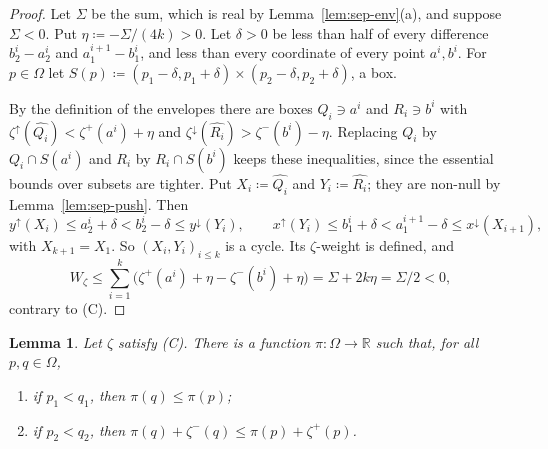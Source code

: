 \documentclass[11pt]{article}
\newtheorem{lemma}[theorem]{Lemma}
\theoremstyle{definition}\newtheorem{definition}[theorem]{Definition}
\theoremstyle{remark}\newtheorem{remark}[theorem]{Remark}
\begin{document}
\begin{proof}
Let $\Sigma$ be the sum, which is real by Lemma~\ref{lem:sep-env}(a), and
suppose $\Sigma<0$. Put $\eta\coloneqq-\Sigma/(4k)>0$. Let $\delta>0$ be less
than half of every difference $b^i_2-a^i_2$ and $a^{i+1}_1-b^i_1$, and less
than every coordinate of every point $a^i,b^i$. For $p\in\Omega$ let
$S(p)\coloneqq(p_1-\delta,p_1+\delta)\times(p_2-\delta,p_2+\delta)$, a box.

By the definition of the envelopes there are boxes $Q_i\ni a^i$ and
$R_i\ni b^i$ with $\zeta^{\uparrow}(\widehat{Q_i})<\zeta^+(a^i)+\eta$ and
$\zeta^{\downarrow}(\widehat{R_i})>\zeta^-(b^i)-\eta$. Replacing $Q_i$ by
$Q_i\cap S(a^i)$ and $R_i$ by $R_i\cap S(b^i)$ keeps these inequalities,
since the essential bounds over subsets are tighter. Put
$X_i\coloneqq\widehat{Q_i}$ and $Y_i\coloneqq\widehat{R_i}$; they are
non-null by Lemma~\ref{lem:sep-push}. Then
\[
 y^{\uparrow}(X_i)\le a^i_2+\delta<b^i_2-\delta\le y^{\downarrow}(Y_i),\qquad
 x^{\uparrow}(Y_i)\le b^i_1+\delta<a^{i+1}_1-\delta\le x^{\downarrow}(X_{i+1}),
\]
with $X_{k+1}=X_1$. So $(X_i,Y_i)_{i\le k}$ is a cycle. Its $\zeta$-weight is
defined, and
\[
 W_\zeta\le\sum_{i=1}^k\bigl(\zeta^+(a^i)+\eta-\zeta^-(b^i)+\eta\bigr)
 =\Sigma+2k\eta=\Sigma/2<0,
\]
contrary to (C).
\end{proof}

\begin{lemma}\label{lem:sep-potential}
Let $\zeta$ satisfy (C). There is a function $\pi\colon\Omega\to\mathbb R$
such that, for all $p,q\in\Omega$,
\begin{enumerate}[label=(P\arabic*)]
\item if $p_1<q_1$, then $\pi(q)\le\pi(p)$;
\item if $p_2<q_2$, then $\pi(q)+\zeta^-(q)\le\pi(p)+\zeta^+(p)$.
\end{enumerate}
\end{lemma}
\end{document}
